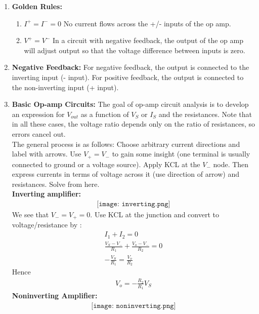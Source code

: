 \documentclass[10pt]{article}
\begin{document}
\begin{multicols}{2}
\begin{enumerate}
     \item \textbf{Golden Rules:} 
     \begin{enumerate}
         \item $I^+=I^-=0$ No current flows across the +/- inputs of the op amp.
         \item $V^+=V^-$ In a circuit with negative feedback, the output of the op amp will adjust output so that the voltage difference between inputs is zero.
     \end{enumerate} 
    
    \item \textbf{Negative Feedback:} For negative feedback, the output is connected to the inverting input (- input). For positive feedback, the output is connected to the non-inverting input (+ input).
    
    \item \textbf{Basic Op-amp Circuits:} The goal of op-amp circuit analysis is to develop an expression for $V_{out}$ as a function of $V_{S}$ or $I_{S}$ and the resistances. Note that in all these cases, the voltage ratio depends only on the ratio of resistances, so errors cancel out. \\
    The general process is as follows: Choose arbitrary current directions and label with arrows. Use $V_+=V_-$ to gain some insight (one terminal is usually connected to ground or a voltage source). Apply KCL at the $V_-$ node. Then express currents in terms of voltage across it (use direction of arrow) and resistances. Solve from here. \\
    \textbf{Inverting amplifier:}
    \begin{align*}
        \texttt{[image: inverting.png]}
     \end{align*}
     We see that $V_-=V_+=0$. Use KCL at the junction and convert to voltage/resistance by : \\
     \begin{align*}
        I_{1} + I_2 = 0 \\
        \frac{V_{S}-V_-}{R_{1}} + \frac{V_o-V_-}{R_2} = 0 \\
        - \frac{V_{S}}{R_{1}} =  \frac{V_o}{R_2}
     \end{align*}
     Hence
     \begin{align*}
         V_{o}=- \frac{R_2}{R_{1}}V_{S}
     \end{align*}
     \textbf{Noninverting Amplifier:}
    \begin{align*}
        \texttt{[image: noninverting.png]}

\end{align*}
\end{enumerate}
\end{multicols}
\end{document}
